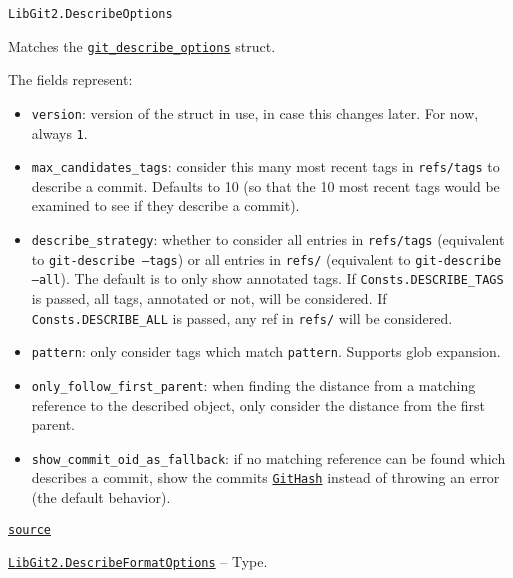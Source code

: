 \begin{adjustwidth}{2em}{0pt}


\begin{verbatim}
LibGit2.DescribeOptions
\end{verbatim}

Matches the \href{https://libgit2.org/libgit2/\#HEAD/type/git\_describe\_options}{\texttt{git\_describe\_options}} struct.

The fields represent:

\begin{itemize}
\item \texttt{version}: version of the struct in use, in case this changes later. For now, always \texttt{1}.


\item \texttt{max\_candidates\_tags}: consider this many most recent tags in \texttt{refs/tags} to describe a commit.  Defaults to 10 (so that the 10 most recent tags would be examined to see if they describe a commit).


\item \texttt{describe\_strategy}: whether to consider all entries in \texttt{refs/tags} (equivalent to \texttt{git-describe --tags})  or all entries in \texttt{refs/} (equivalent to \texttt{git-describe --all}). The default is to only show annotated tags.  If \texttt{Consts.DESCRIBE\_TAGS} is passed, all tags, annotated or not, will be considered.  If \texttt{Consts.DESCRIBE\_ALL} is passed, any ref in \texttt{refs/} will be considered.


\item \texttt{pattern}: only consider tags which match \texttt{pattern}. Supports glob expansion.


\item \texttt{only\_follow\_first\_parent}: when finding the distance from a matching reference to the described  object, only consider the distance from the first parent.


\item \texttt{show\_commit\_oid\_as\_fallback}: if no matching reference can be found which describes a commit, show the  commit{\textquotesingle}s \hyperlink{202290709580230708}{\texttt{GitHash}} instead of throwing an error (the default behavior).

\end{itemize}


\href{https://github.com/JuliaLang/julia/blob/44fa15b1502a45eac76c9017af94332d4557b251/base/#L0-L18}{\texttt{source}}


\end{adjustwidth}
\hypertarget{6319202671460827960}{} 
\hyperlink{6319202671460827960}{\texttt{LibGit2.DescribeFormatOptions}}  -- {Type.}

